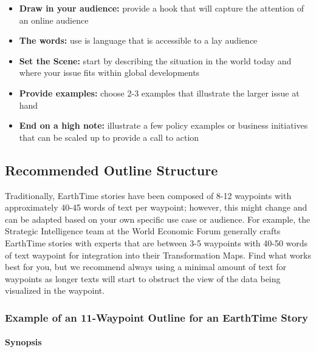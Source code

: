 \documentclass[
]{book}
\providecommand{\tightlist}{%
  \setlength{\itemsep}{0pt}\setlength{\parskip}{0pt}}
\begin{document}
\begin{itemize}
\tightlist
\item
  \textbf{Draw in your audience:} provide a hook that will capture the attention of an online audience
\item
  \textbf{The words:} use is language that is accessible to a lay audience
\item
  \textbf{Set the Scene:} start by describing the situation in the world today and where your issue fits within global developments
\item
  \textbf{Provide examples:} choose 2-3 examples that illustrate the larger issue at hand
\item
  \textbf{End on a high note:} illustrate a few policy examples or business initiatives that can be scaled up to provide a call to action
\end{itemize}

\hypertarget{recommended-outline-structure}{%
\subsection*{Recommended Outline Structure}\label{recommended-outline-structure}}


Traditionally, EarthTime stories have been composed of 8-12 waypoints with approximately 40-45 words of text per waypoint; however, this might change and can be adapted based on your own specific use case or audience. For example, the Strategic Intelligence team at the World Economic Forum generally crafts EarthTime stories with experts that are between 3-5 waypoints with 40-50 words of text waypoint for integration into their Transformation Maps. Find what works best for you, but we recommend always using a minimal amount of text for waypoints as longer texts will start to obstruct the view of the data being visualized in the waypoint.

\hypertarget{example-of-an-11-waypoint-outline-for-an-earthtime-story}{%
\subsubsection*{Example of an 11-Waypoint Outline for an EarthTime Story}\label{example-of-an-11-waypoint-outline-for-an-earthtime-story}}


\hypertarget{synopsis}{%
\paragraph*{Synopsis}\label{synopsis}}
\end{document}
